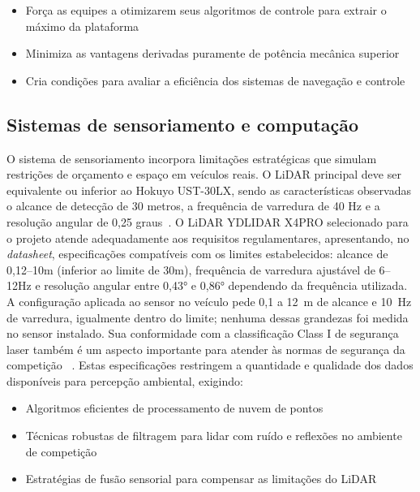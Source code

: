 \begin{itemize}
      \item Força as equipes a otimizarem seus algoritmos de controle para extrair o máximo
            da plataforma
      \item Minimiza as vantagens derivadas puramente de potência mecânica superior
      \item Cria condições para avaliar a eficiência dos sistemas de navegação e controle
\end{itemize}

\subsection{Sistemas de sensoriamento e computação}

O sistema de sensoriamento incorpora limitações estratégicas que simulam
restrições de orçamento e espaço em veículos reais. O LiDAR principal deve ser
equivalente ou inferior ao Hokuyo UST-30LX, sendo as características observadas
o alcance de detecção de 30 metros, a frequência de varredura de 40 Hz e a
resolução angular de 0,25 graus~\cite{F1TENTHRules2023}. O LiDAR YDLIDAR X4PRO selecionado para o
projeto atende adequadamente aos requisitos regulamentares, apresentando, no
\textit{datasheet}, especificações compatíveis com os limites estabelecidos:
alcance de 0,12--10m (inferior ao limite de 30m), frequência de varredura
ajustável de 6--12Hz e resolução angular entre 0,43° e 0,86° dependendo da
frequência utilizada. A configuração aplicada ao sensor no veículo pede 0,1 a
12~m de alcance e 10~Hz de varredura, igualmente dentro do limite; nenhuma
dessas grandezas foi medida no sensor instalado. Sua
conformidade com a classificação Class I de segurança laser também é um aspecto
importante para atender às normas de segurança da competição
~\cite{F1TENTHRules2023}. Estas especificações restringem a quantidade e
qualidade dos dados disponíveis para percepção ambiental, exigindo:

\begin{itemize}
      \item Algoritmos eficientes de processamento de nuvem de pontos
      \item Técnicas robustas de filtragem para lidar com ruído e reflexões no ambiente de
            competição
      \item Estratégias de fusão sensorial para compensar as limitações do LiDAR
\end{itemize}

